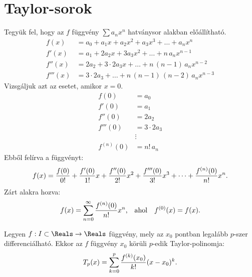 \clearpage
\section{Taylor-sorok}\label{sec-02-02}

\begin{blueBox}
  Tegyük fel, hogy az $f$ függvény $\sum a_n x^n$ hatványsor alakban
  előállítható.
  \begin{align*}
    f(x)    & = a_0 + a_1 x + a_2 x^2 + a_3 x^3 + \ldots + a_n x^n
    \\
    f'(x)   & = a_1 + 2 a_2 x + 3 a_3 x^2 + \ldots + n \, a_n x^{n-1}
    \\
    f''(x)  & = 2 a_2 + 3 \cdot 2 a_3 x + \ldots + n \, (n-1) \, a_n x^{n-2}
    \\
    f'''(x) & = 3 \cdot 2 a_3 + \ldots + n \, (n-1) \, (n-2) \, a_n x^{n-3}
  \end{align*}
  Vizsgáljuk azt az esetet, amikor $x = 0$.
  \begin{align*}
    f(0)       & = a_0
    \\
    f'(0)      & = a_1
    \\
    f''(0)     & = 2 a_2
    \\
    f'''(0)    & = 3 \cdot 2 a_3
    \\
               & \vdots
    \\
    f^{(n)}(0) & = n! \, a_n
  \end{align*}
  Ebből felírva a függvényt:
  $$
    f(x)
    = \frac{f(0)}{0!}
    + \frac{f'(0)}{1!} x
    + \frac{f''(0)}{2!} x^2
    + \frac{f'''(0)}{3!} x^3
    + \dots
    + \frac{f^{(n)}(0)}{n!} x^n
    \text.
  $$
  Zárt alakra hozva:
  $$
    f(x)
    = \sum_{n=0}^{\infty} \frac{f^{(n)}(0)}{n!} x^n
    \text, \quad \text{ahol} \quad
    f^{(0)}(x) = f(x)
    \text.
  $$
\end{blueBox}

\begin{definition}
  Legyen $f: I \subset \Reals \to \Reals$ függvény, mely az $x_0$ pontban
  legalább $p$-szer differenciálható. Ekkor az $f$ függvény $x_0$ körüli
  $p$-edik Taylor-polinomja:
  $$
    T_p(x) = \sum_{k=0}^{p} \frac{f^{(k)}(x_0)}{k!} (x - x_0)^k
    \text.
  $$
\end{definition}

